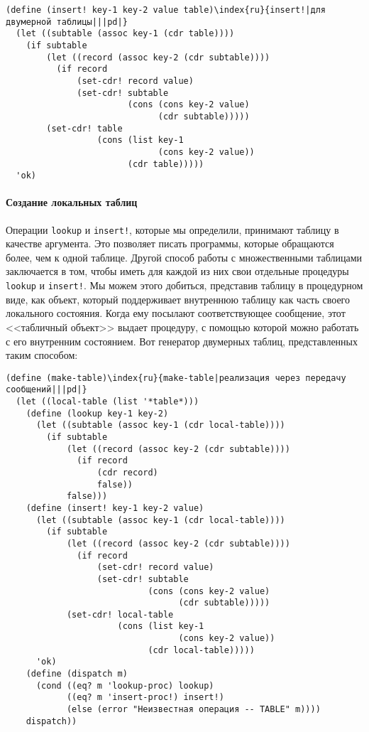 \begin{Verbatim}[fontsize=\small]
(define (insert! key-1 key-2 value table)\index{ru}{insert!|для двумерной таблицы|||pd|}
  (let ((subtable (assoc key-1 (cdr table))))
    (if subtable
        (let ((record (assoc key-2 (cdr subtable))))
          (if record
              (set-cdr! record value)
              (set-cdr! subtable
                        (cons (cons key-2 value)
                              (cdr subtable)))))
        (set-cdr! table
                  (cons (list key-1
                              (cons key-2 value))
                        (cdr table)))))
  'ok)
\end{Verbatim}

\paragraph{Создание локальных таблиц}

Операции {\tt lookup} и {\tt insert!},
которые мы определили, принимают таблицу в качестве аргумента.  Это
позволяет писать программы, которые обращаются более, чем к одной
таблице.  Другой способ работы с множественными таблицами заключается
в том, чтобы иметь для каждой из них свои отдельные процедуры {\tt lookup}
и {\tt insert!}.  Мы можем этого добиться, представив таблицу
в процедурном виде, как объект, который поддерживает внутреннюю
таблицу как часть своего локального состояния.  Когда ему посылают
соответствующее сообщение, этот <<табличный объект>> выдает процедуру,
с помощью которой можно работать с его внутренним состоянием.  Вот
генератор двумерных таблиц, представленных таким способом:

\begin{Verbatim}[fontsize=\small]
(define (make-table)\index{ru}{make-table|реализация через передачу сообщений|||pd|}
  (let ((local-table (list '*table*)))
    (define (lookup key-1 key-2)
      (let ((subtable (assoc key-1 (cdr local-table))))
        (if subtable
            (let ((record (assoc key-2 (cdr subtable))))
              (if record
                  (cdr record)
                  false))
            false)))
    (define (insert! key-1 key-2 value)
      (let ((subtable (assoc key-1 (cdr local-table))))
        (if subtable
            (let ((record (assoc key-2 (cdr subtable))))
              (if record
                  (set-cdr! record value)
                  (set-cdr! subtable
                            (cons (cons key-2 value)
                                  (cdr subtable)))))
            (set-cdr! local-table
                      (cons (list key-1
                                  (cons key-2 value))
                            (cdr local-table)))))
      'ok)
    (define (dispatch m)
      (cond ((eq? m 'lookup-proc) lookup)
            ((eq? m 'insert-proc!) insert!)
            (else (error "Неизвестная операция -- TABLE" m))))
    dispatch))
\end{Verbatim}

